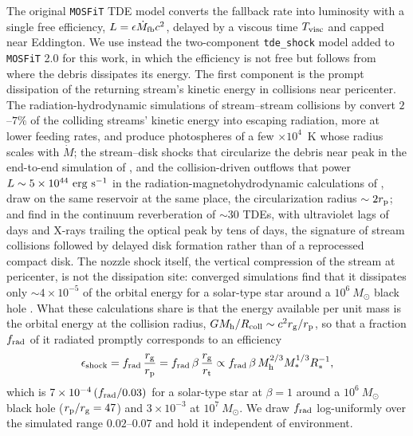 \documentclass[twocolumn,pdftex]{aastex701}
\newcommand{\msun}{M_{\odot}\xspace}
\newcommand{\mosfit}{{\tt MOSFiT}\xspace}
\begin{document}
The original \mosfit TDE model converts the fallback rate into luminosity with a single free efficiency, $L = \epsilon \dot{M}_{\rm fb} c^{2}$, delayed by a viscous time $T_{\rm visc}$ and capped near Eddington. We use instead the two-component {\tt tde\_shock} model added to \mosfit 2.0 for this work, in which the efficiency is not free but follows from where the debris dissipates its energy. The first component is the prompt dissipation of the returning stream's kinetic energy in collisions near pericenter. The radiation-hydrodynamic simulations of stream--stream collisions by \citet{Jiang:2016b} convert $2$--$7\%$ of the colliding streams' kinetic energy into escaping radiation, more at lower feeding rates, and produce photospheres of a few $\times 10^{4}$~K whose radius scales with $\dot{M}$; the stream--disk shocks that circularize the debris near peak in the end-to-end simulation of \citet{Steinberg:2024a}, and the collision-driven outflows that power $L \sim 5 \times 10^{44}~{\rm erg~s^{-1}}$ in the radiation-magnetohydrodynamic calculations of \citet{Meza:2025a}, draw on the same reservoir at the same place, the circularization radius $\sim 2 r_{\rm p}$; and \citet{Guo:2025a} find in the continuum reverberation of $\sim 30$ TDEs, with ultraviolet lags of days and X-rays trailing the optical peak by tens of days, the signature of stream collisions followed by delayed disk formation rather than of a reprocessed compact disk. The nozzle shock itself, the vertical compression of the stream at pericenter, is not the dissipation site: converged simulations find that it dissipates only $\sim 4 \times 10^{-5}$ of the orbital energy for a solar-type star around a $10^{6}~\msun$ black hole \citep{Hu:2026a,Andalman:2026a,Kubli:2026a}. What these calculations share is that the energy available per unit mass is the orbital energy at the collision radius, $G M_{\rm h}/R_{\rm coll} \sim c^{2} r_{\rm g}/r_{\rm p}$, so that a fraction $f_{\rm rad}$ of it radiated promptly corresponds to an efficiency
\begin{equation}
\epsilon_{\rm shock} = f_{\rm rad}\, \frac{r_{\rm g}}{r_{\rm p}} = f_{\rm rad}\, \beta\, \frac{r_{\rm g}}{r_{\rm t}} \propto f_{\rm rad}\, \beta\, M_{\rm h}^{2/3} M_{\ast}^{1/3} R_{\ast}^{-1},
\label{eq:epsshock}
\end{equation}
which is $7 \times 10^{-4}\, (f_{\rm rad}/0.03)$ for a solar-type star at $\beta = 1$ around a $10^{6}~\msun$ black hole ($r_{\rm p}/r_{\rm g} = 47$) and $3 \times 10^{-3}$ at $10^{7}~\msun$. We draw $f_{\rm rad}$ log-uniformly over the simulated range $0.02$--$0.07$ and hold it independent of environment.
\end{document}
